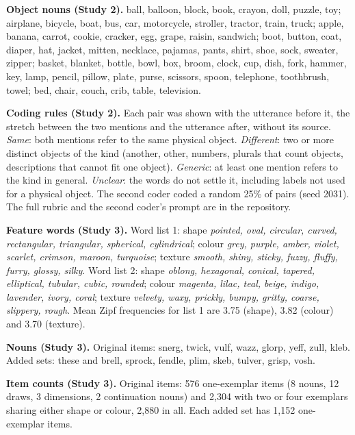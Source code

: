 \FloatBarrier
{}\label{app:G}
\setcounter{table}{0}\renewcommand{\thetable}{G\arabic{table}}
\setcounter{figure}{0}\renewcommand{\thefigure}{G\arabic{figure}}
\textbf{Object nouns (Study 2).} ball, balloon, block, book, crayon, doll, puzzle, toy; airplane, bicycle, boat, bus, car, motorcycle, stroller, tractor, train, truck; apple, banana, carrot, cookie, cracker, egg, grape, raisin, sandwich; boot, button, coat, diaper, hat, jacket, mitten, necklace, pajamas, pants, shirt, shoe, sock, sweater, zipper; basket, blanket, bottle, bowl, box, broom, clock, cup, dish, fork, hammer, key, lamp, pencil, pillow, plate, purse, scissors, spoon, telephone, toothbrush, towel; bed, chair, couch, crib, table, television.

\textbf{Coding rules (Study 2).} Each pair was shown with the utterance before it, the stretch between the two mentions and the utterance after, without its source. \emph{Same}: both mentions refer to the same physical object. \emph{Different}: two or more distinct objects of the kind (another, other, numbers, plurals that count objects, descriptions that cannot fit one object). \emph{Generic}: at least one mention refers to the kind in general. \emph{Unclear}: the words do not settle it, including labels not used for a physical object. The second coder coded a random 25\% of pairs (seed 2031). The full rubric and the second coder's prompt are in the repository.

\textbf{Feature words (Study 3).} Word list 1: shape \emph{pointed, oval, circular, curved, rectangular, triangular, spherical, cylindrical}; colour \emph{grey, purple, amber, violet, scarlet, crimson, maroon, turquoise}; texture \emph{smooth, shiny, sticky, fuzzy, fluffy, furry, glossy, silky}. Word list 2: shape \emph{oblong, hexagonal, conical, tapered, elliptical, tubular, cubic, rounded}; colour \emph{magenta, lilac, teal, beige, indigo, lavender, ivory, coral}; texture \emph{velvety, waxy, prickly, bumpy, gritty, coarse, slippery, rough}. Mean Zipf frequencies for list 1 are 3.75 (shape), 3.82 (colour) and 3.70 (texture).

\textbf{Nouns (Study 3).} Original items: snerg, twick, vulf, wazz, glorp, yeff, zull, kleb. Added sets: these and brell, sprock, fendle, plim, skeb, tulver, grisp, vosh.

\textbf{Item counts (Study 3).} Original items: 576 one-exemplar items (8 nouns, 12 draws, 3 dimensions, 2 continuation nouns) and 2,304 with two or four exemplars sharing either shape or colour, 2,880 in all. Each added set has 1,152 one-exemplar items.

